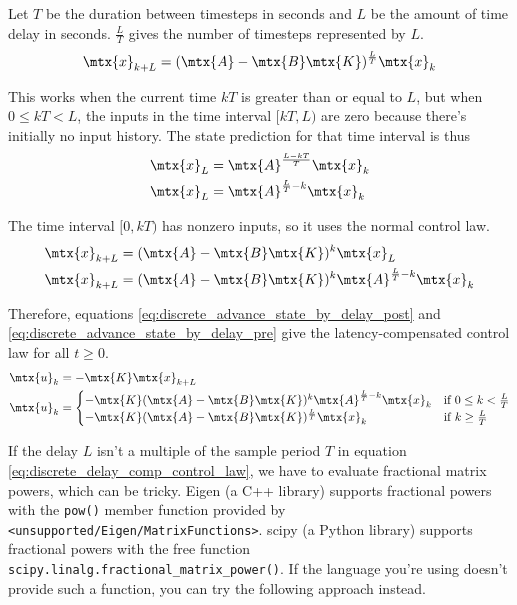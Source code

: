 Let $T$ be the duration between timesteps in seconds and $L$ be the amount of
time delay in seconds. $\frac{L}{T}$ gives the number of timesteps represented
by $L$.
\begin{equation}
  \mtx{x}_{k+L} = (\mtx{A} - \mtx{B}\mtx{K})^\frac{L}{T} \mtx{x}_k
    \label{eq:discrete_advance_state_by_delay_post}
\end{equation}

This works when the current time $kT$ is greater than or equal to $L$, but when
$0 \leq kT < L$, the inputs in the time interval $[kT, L)$ are zero because
there's initially no input history. The state prediction for that time interval
is thus
\begin{align*}
  \mtx{x}_L &= \mtx{A}^\frac{L - kT}{T} \mtx{x}_k \\
  \mtx{x}_L &= \mtx{A}^{\frac{L}{T} - k} \mtx{x}_k
\end{align*}

The time interval $[0, kT)$ has nonzero inputs, so it uses the normal control
law.
\begin{align}
  \mtx{x}_{k + L} &= (\mtx{A} - \mtx{B}\mtx{K})^k \mtx{x}_L \nonumber \\
  \mtx{x}_{k + L} &= (\mtx{A} - \mtx{B}\mtx{K})^k
    \mtx{A}^{\frac{L}{T} - k} \mtx{x}_k
    \label{eq:discrete_advance_state_by_delay_pre}
\end{align}

Therefore, equations \eqref{eq:discrete_advance_state_by_delay_post} and
\eqref{eq:discrete_advance_state_by_delay_pre} give the latency-compensated
control law for all $t \geq 0$.
\begin{align}
  \mtx{u}_k &= -\mtx{K} \mtx{x}_{k + L} \nonumber \\
  \mtx{u}_k &=
  \begin{cases}
    -\mtx{K} (\mtx{A} - \mtx{B}\mtx{K})^k \mtx{A}^{\frac{L}{T} - k} \mtx{x}_k &
      \text{if } 0 \leq k < \frac{L}{T} \\
    -\mtx{K} (\mtx{A} - \mtx{B}\mtx{K})^\frac{L}{T} \mtx{x}_k &
      \text{if } k \geq \frac{L}{T}
  \end{cases}
  \label{eq:discrete_delay_comp_control_law}
\end{align}

If the delay $L$ isn't a multiple of the sample period $T$ in equation
\eqref{eq:discrete_delay_comp_control_law}, we have to evaluate fractional
matrix powers, which can be tricky. Eigen (a C++ library) supports fractional
powers with the \texttt{pow()} member function provided by
\texttt{<unsupported/Eigen/MatrixFunctions>}. scipy (a Python library) supports
fractional powers with the free function
\texttt{scipy.linalg.fractional\_matrix\_power()}. If the language you're using
doesn't provide such a function, you can try the following approach instead.

